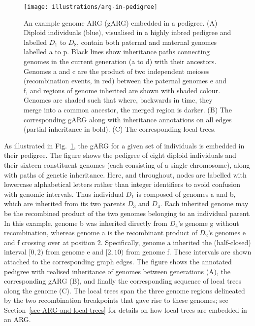 \documentclass{article}
\newcommand{\noderef}[1]{\textsf{#1}}
\begin{document}
\begin{figure}
\begin{center}
    \texttt{[image: illustrations/arg-in-pedigree]}
\end{center}
\caption{\label{fig-arg-in-pedigree}
An example genome ARG (gARG) embedded in a pedigree.
(A) Diploid individuals (blue), visualised in a highly inbred pedigree and
labelled $D_1$ to $D_8$,
contain both paternal and maternal  genomes
labelled \noderef{a} to \noderef{p}. Black lines show inheritance paths connecting
genomes in the current generation (\noderef{a} to \noderef{d}) with their ancestors.
Genomes \noderef{a} and \noderef{c} are the product of two independent
meioses (recombination events, in red) between
the paternal genomes \noderef{e}
and \noderef{f}, and regions of genome inherited are shown with shaded colour.
Genomes are shaded such that where, backwards in time,
they merge into a common ancestor, the merged region is darker.
(B) The corresponding gARG along with inheritance annotations on all edges
(partial inheritance in bold).
(C) The corresponding local trees.
}
\end{figure}

As illustrated in Fig.~\ref{fig-arg-in-pedigree},
the gARG for a given set of individuals is embedded in their pedigree.
The figure shows the pedigree of eight diploid individuals
and their sixteen constituent genomes (each consisting of a single chromosome),
along with paths of genetic inheritance.
Here, and throughout,
nodes are labelled with lowercase alphabetical letters
rather than integer identifiers to avoid confusion with genomic intervals.
Thus individual $D_1$ is composed
of genomes \noderef{a} and \noderef{b}, which are inherited from its
two parents $D_3$ and $D_4$. Each inherited genome may be the recombined product
of the two genomes belonging to an individual parent.
In this example,
genome \noderef{b} was inherited directly from $D_4$'s genome \noderef{g} without
recombination, whereas
genome \noderef{a} is the recombinant product of
$D_2$'s genomes \noderef{e} and \noderef{f} crossing over at position 2.
Specifically, genome \noderef{a} inherited the (half-closed)
interval $[0, 2)$ from genome \noderef{e} and $[2, 10)$ from genome \noderef{f}.
These intervals are shown attached to the corresponding graph edges.
The figure shows the annotated pedigree with realised inheritance of genomes
between generations (A), the corresponding gARG (B), and finally the corresponding
sequence of local trees along the
genome (C).
The local trees span the three genome regions delineated
by the two recombination breakpoints that gave rise to these genomes;
see Section~\ref{sec-ARG-and-local-trees} for details
on how local trees are embedded in an ARG.
\end{document}
